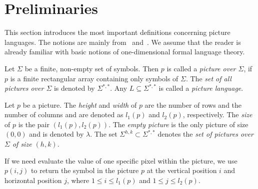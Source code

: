 \section{Preliminaries}
This section introduces the most important definitions concerning picture languages. The notions are
mainly from~\cite{giammarresi1997twodimensional} and~\cite{cherubini2009picture}. We assume that
the reader is already familiar with basic notions of one-dimensional formal language theory.
\begin{definition}
	Let $\Sigma$ be a finite, non-empty set of symbols. Then $p$ is called a \emph{picture over
	$\Sigma$}, if $p$ is a finite rectangular array containing only symbols of $\Sigma$. The \emph{set
	of all pictures over $\Sigma$} is denoted by $\Sigma^{*,*}$. Any $L\subseteq\Sigma^{*,*}$ is called a
	\emph{picture language}.
\end{definition}
Let $p$ be a picture. The \emph{height} and \emph{width} of $p$ are the number of rows and the
number of columns and are denoted as $l_1(p)$ and $l_2(p)$, respectively. The \emph{size} of $p$ is
the pair $(l_1(p), l_2(p))$. The \emph{empty picture} is the only picture of size $(0, 0)$ and is
denoted by $\lambda$. The set $\Sigma^{h, k} \subset \Sigma^{*, *}$ denotes the \emph{set of
pictures over $\Sigma$ of size $(h, k)$}.

If we need evaluate the value of one specific pixel within the picture, we use $p(i, j)$ to return
the symbol in the picture $p$ at the vertical position $i$ and horizontal position $j$, where $1
\leq i \leq l_1(p)$ and $1 \leq j \leq l_2(p)$.


